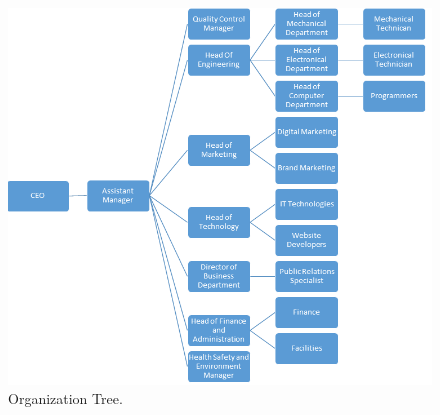 \begin{figure}
     \centering
     \includegraphics[width=16cm]{organizationtree.png}
     \caption{Organization Tree.}
     \label{fig:organization tree}
\end{figure}